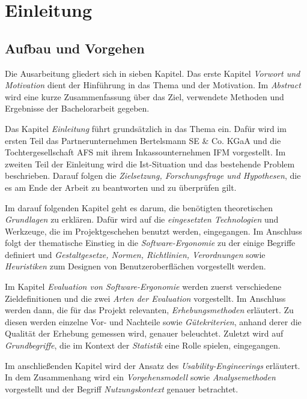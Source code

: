 \section{Einleitung}

\subsection{Aufbau und Vorgehen}
Die Ausarbeitung gliedert sich in sieben Kapitel. Das erste Kapitel \textit{Vorwort und Motivation} dient der Hinführung in das Thema und der Motivation. Im \textit{Abstract} wird eine kurze Zusammenfassung über das Ziel, verwendete Methoden und Ergebnisse der Bachelorarbeit gegeben.

Das Kapitel \textit{Einleitung} führt grundsätzlich in das Thema ein. Dafür wird im ersten Teil das Partnerunternehmen Bertelsmann SE \& Co. KGaA und die Tochtergesellschaft \gls{AFS} mit ihrem Inkassounternehmen \gls{IFM} vorgestellt. Im zweiten Teil der Einleitung wird die Ist-Situation und das bestehende Problem beschrieben. Darauf folgen die \textit{Zielsetzung, Forschungsfrage und Hypothesen}, die es am Ende der Arbeit zu beantworten und zu überprüfen gilt. 

Im darauf folgenden Kapitel geht es darum, die benötigten theoretischen \textit{Grundlagen} zu erklären. Dafür wird auf die \textit{eingesetzten Technologien} und Werkzeuge, die im Projektgeschehen benutzt werden, eingegangen. Im Anschluss folgt der thematische Einstieg in die \textit{Software-Ergonomie} zu der einige Begriffe definiert und \textit{Gestaltgesetze, Normen, Richtlinien, Verordnungen} sowie \textit{Heuristiken} zum Designen von Benutzeroberflächen vorgestellt werden. 

Im Kapitel \textit{Evaluation von Software-Ergonomie} werden zuerst verschiedene Zieldefinitionen und die zwei \textit{Arten der Evaluation} vorgestellt. Im Anschluss werden dann, die für das Projekt relevanten, \textit{Erhebungsmethoden} erläutert. Zu diesen werden einzelne Vor- und Nachteile sowie \textit{Gütekriterien}, anhand derer die Qualität der Erhebung gemessen wird, genauer beleuchtet. Zuletzt wird auf \textit{Grundbegriffe}, die im Kontext der \textit{Statistik} eine Rolle spielen, eingegangen.

Im anschließenden Kapitel wird der Ansatz des \textit{Usability-Engineerings} erläutert. In dem Zusammenhang wird ein \textit{Vorgehensmodell} sowie \textit{Analysemethoden} vorgestellt und der Begriff \textit{Nutzungskontext} genauer betrachtet. 

